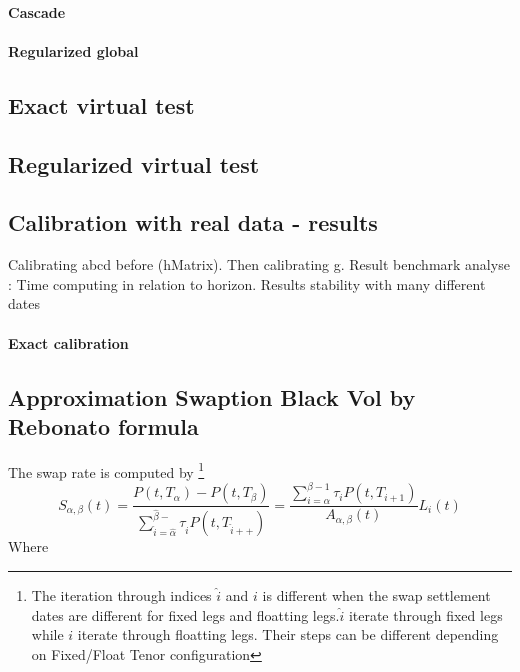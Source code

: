 \documentclass[a4paper,10pt]{article}
\newcommand{\Ptii}{P(t,T_{i+1})}
\newcommand{\Lit}{L_{i}(t)}
\begin{document}
\paragraph{Cascade}
\paragraph{Regularized global}

\subsection{Exact virtual test}
\subsection{Regularized virtual test}
\subsection{Calibration with real data - results}
Calibrating abcd before (hMatrix). Then calibrating g. Result benchmark analyse : Time computing in relation to horizon. Results stability with many different dates
\paragraph{Exact calibration}

\subsection{Approximation Swaption Black Vol by Rebonato formula}
The swap rate is computed by \footnote{The iteration through indices $\hat{i}$ and $i$ is different when the swap settlement dates are different for fixed legs and floatting legs.$\hat{i}$ iterate through fixed legs while $i$ iterate through floatting legs. Their steps can be different depending on Fixed/Float Tenor configuration}
\[
S_{\alpha,\beta}(t) 
= 
\frac{P(t,T_{\alpha})-P(t,T_{\beta})}{\sum^{\hat{\beta}-}_{\hat{i}=\hat{\alpha}}\tau_{\hat{i}}P(t,T_{\hat{i}++})} 
=
\frac{\sum^{\beta-1}_{i=\alpha} \tau_i \Ptii }{A_{\alpha,\beta}(t)} \Lit 
\]
Where 
\end{document}
